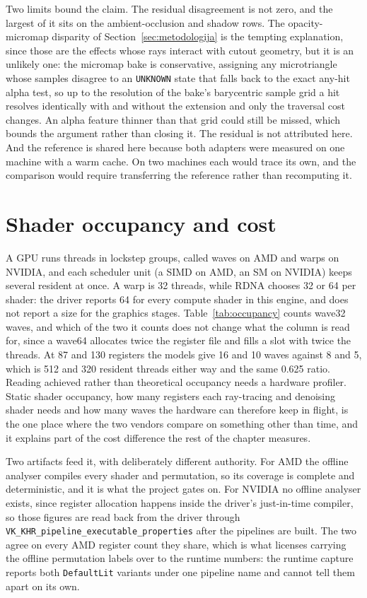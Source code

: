 Two limits bound the claim. The residual disagreement is not zero, and the largest of it sits on the
ambient-occlusion and shadow rows. The opacity-micromap disparity of
Section~\ref{sec:metodologija} is the tempting explanation, since those are the effects whose rays
interact with cutout geometry, but it is an unlikely one: the micromap bake is conservative,
assigning any microtriangle whose samples disagree to an \texttt{UNKNOWN} state that falls back to
the exact any-hit alpha test, so up to the resolution of the bake's barycentric sample grid a hit
resolves identically with and without the extension and only the traversal cost changes. An alpha
feature thinner than that grid could still be missed, which bounds the argument rather than closing
it. The residual is not attributed here.
And the reference is shared here because both adapters were measured on one machine with a warm cache.
On two machines each would trace its own, and the comparison would require transferring the reference
rather than recomputing it.

\section{Shader occupancy and cost}
\label{sec:occupancy}

A GPU runs threads in lockstep groups, called waves on AMD and warps on NVIDIA, and each scheduler
unit (a SIMD on AMD, an SM on NVIDIA) keeps several resident at once. A warp is 32 threads, while
RDNA chooses 32 or 64 per shader: the driver reports 64 for every compute shader in this engine, and
does not report a size for the graphics stages. Table~\ref{tab:occupancy} counts wave32 waves, and
which of the two it counts does not change what the column is read for, since a wave64 allocates
twice the register file and fills a slot with twice the threads. At 87 and 130 registers the models
give 16 and 10 waves against 8 and 5, which is 512 and 320 resident threads either way and the same
0.625 ratio. Reading achieved rather than theoretical occupancy needs a hardware profiler. Static shader
occupancy, how many registers each ray-tracing and denoising shader needs and how many
waves the hardware can therefore keep in flight, is the one place where the two vendors compare on
something other than time, and it explains part of the cost difference the rest of the chapter
measures.

Two artifacts feed it, with deliberately different authority. For AMD the offline analyser compiles
every shader and permutation, so its coverage is complete and deterministic, and it is what the
project gates on. For NVIDIA no offline analyser exists, since register allocation happens inside the
driver's just-in-time compiler, so those figures are read back from the driver through
\texttt{VK\_KHR\_pipeline\_executable\_properties} after the pipelines are built. The two agree on
every AMD register count they share, which is what licenses carrying the offline permutation labels
over to the runtime numbers: the runtime capture reports both \texttt{DefaultLit} variants under one
pipeline name and cannot tell them apart on its own.

